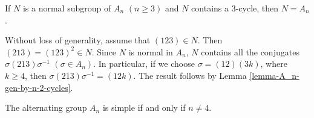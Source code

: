 \begin{lemma} \label{lemma-A_n-contains-3-cycle}
	If $N$ is a normal subgroup of $A_n$ $(n\geq 3)$ and $N$ contains a $3$-cycle, then $N=A_n$.
\end{lemma}
\begin{sketch}
	Without loss of generality, assume that  $(123)\in N$. Then $(213) = (123)^2\in N$. Since $N$ is normal in $A_n$, $N$ contains all the conjugates $\sigma (213)\sigma^{-1}$ $(\sigma\in A_n)$. In particular, if we choose $\sigma = (12)(3k) $, where $k\geq 4$, then $\sigma (213)\sigma^{-1} = (12k)$. The result follows by Lemma \ref{lemma-A_n-gen-by-n-2-cycles}.
\end{sketch}

\begin{theorem}
	The alternating group $A_n$ is simple if and only if $n\neq 4$.
\end{theorem}
